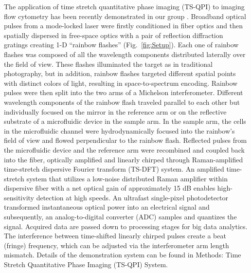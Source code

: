 \documentclass[aps,pra,reprint,superscriptaddress]{revtex4-1}
\begin{document}
The application of time stretch quantitative phase imaging (TS-QPI) to imaging flow cytometry has been recently demonstrated in our group \cite{mahjoubfar2013label}. Broadband optical pulses from a mode-locked laser were firstly conditioned in fiber optics and then spatially dispersed in free-space optics with a pair of reflection diffraction gratings creating 1-D ``rainbow flashes'' (Fig.~\ref{fig:Setup}). Each one of rainbow flashes was composed of all the wavelength components distributed laterally over the field of view. These flashes illuminated the target as in traditional photography, but in addition, rainbow flashes targeted different spatial points with distinct colors of light, resulting in space-to-spectrum encoding. Rainbow pulses were then split into the two arms of a Michelson interferometer. Different wavelength components of the rainbow flash traveled parallel to each other but individually focused on the mirror in the reference arm or on the reflective substrate of a microfluidic device in the sample arm. In the sample arm, the cells in the microfluidic channel were hydrodynamically focused \cite{knight1998hydrodynamic,lee2006hydrodynamic} into the rainbow's field of view and flowed perpendicular to the rainbow flash. Reflected pulses from the microfluidic device and the reference arm were recombined and coupled back into the fiber, optically amplified and linearly chirped through Raman-amplified time-stretch dispersive Fourier transform (TS-DFT) system. An amplified time-stretch system that utilizes a low-noise distributed Raman amplifier within dispersive fiber with a net optical gain of approximately 15 dB enables high-sensitivity detection at high speeds. An ultrafast single-pixel photodetector transformed instantaneous optical power into an electrical signal and subsequently, an analog-to-digital converter (ADC) samples and quantizes the signal. Acquired data are passed down to processing stages for big data analytics. The interference between time-shifted linearly chirped pulses create a beat (fringe) frequency, which can be adjusted via the interferometer arm length mismatch. Details of the demonstration system can be found in Methods: Time Stretch Quantitative Phase Imaging (TS-QPI) System.
\end{document}
